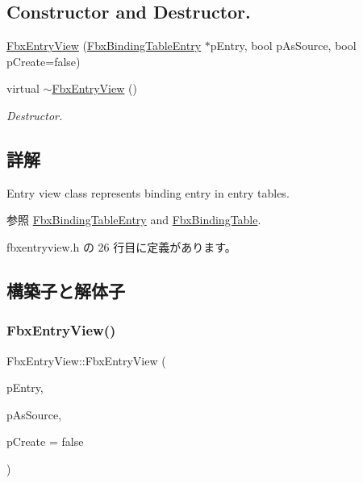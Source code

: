 \subsection*{Constructor and Destructor.}
\begin{DoxyCompactItemize}
\item 
\hyperlink{class_fbx_entry_view_a16e4c36a79ae38f1fc4b31973f43c15c}{Fbx\+Entry\+View} (\hyperlink{class_fbx_binding_table_entry}{Fbx\+Binding\+Table\+Entry} $\ast$p\+Entry, bool p\+As\+Source, bool p\+Create=false)
\item 
virtual \hyperlink{class_fbx_entry_view_a8adf9f4b899377fef920fd7b5e2bfcbf}{$\sim$\+Fbx\+Entry\+View} ()
\begin{DoxyCompactList}\small\item\em Destructor. \end{DoxyCompactList}\end{DoxyCompactItemize}


\subsection{詳解}
Entry view class represents binding entry in entry tables. \begin{DoxySeeAlso}{参照}
\hyperlink{class_fbx_binding_table_entry}{Fbx\+Binding\+Table\+Entry} and \hyperlink{class_fbx_binding_table}{Fbx\+Binding\+Table}. 
\end{DoxySeeAlso}


 fbxentryview.\+h の 26 行目に定義があります。



\subsection{構築子と解体子}
\mbox{\label{class_fbx_entry_view_a16e4c36a79ae38f1fc4b31973f43c15c}} 
\subsubsection{\texorpdfstring{Fbx\+Entry\+View()}{FbxEntryView()}}
{\footnotesize\ttfamily Fbx\+Entry\+View\+::\+Fbx\+Entry\+View (\begin{DoxyParamCaption}\item[{\hyperlink{class_fbx_binding_table_entry}{Fbx\+Binding\+Table\+Entry} $\ast$}]{p\+Entry,  }\item[{bool}]{p\+As\+Source,  }\item[{bool}]{p\+Create = {\ttfamily false} }\end{DoxyParamCaption})}

